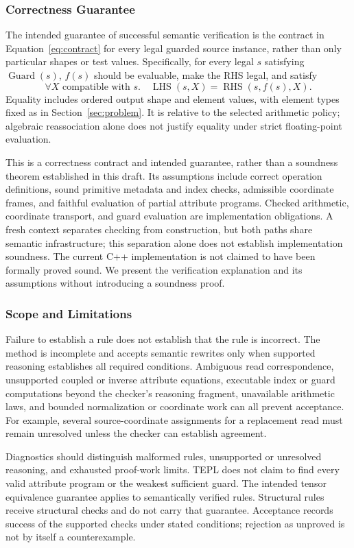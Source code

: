\FloatBarrier
\subsubsection{Correctness Guarantee}
\label{sec:guarantee}
The intended guarantee of successful semantic verification is the contract
in Equation~\eqref{eq:contract} for every legal guarded source instance,
rather than only particular shapes or test values. Specifically, for every
legal $s$ satisfying $\operatorname{Guard}(s)$, $f(s)$ should be evaluable,
make the RHS legal, and satisfy
\begin{equation}
 \forall X\text{ compatible with }s.\quad
 \operatorname{LHS}(s,X)=\operatorname{RHS}(s,f(s),X).
\end{equation}
Equality includes ordered output shape and element values, with element types
fixed as in Section~\ref{sec:problem}. It is relative to the selected arithmetic
policy; algebraic reassociation alone does not justify equality under strict
floating-point evaluation.

This is a correctness contract and intended guarantee, rather than a soundness
theorem established in this draft. Its assumptions include correct operation
definitions, sound primitive metadata and index checks, admissible coordinate
frames, and faithful evaluation of partial attribute programs. Checked
arithmetic, coordinate transport, and guard evaluation are implementation
obligations. A fresh context separates checking from construction, but both
paths share semantic infrastructure; this separation alone does not establish
implementation soundness. The current C++ implementation is not claimed to
have been formally proved sound. We present the verification explanation and
its assumptions without introducing a soundness proof.

\FloatBarrier
\subsubsection{Scope and Limitations}
Failure to establish a rule does not establish that the rule is incorrect.
The method is incomplete and accepts semantic rewrites only when supported
reasoning establishes all required conditions. Ambiguous read correspondence,
unsupported coupled or inverse attribute equations, executable index or guard
computations beyond the checker's reasoning fragment, unavailable arithmetic
laws, and bounded normalization or coordinate work can all prevent acceptance.
For example, several source-coordinate assignments for a replacement read
must remain unresolved unless the checker can establish agreement.

Diagnostics should distinguish malformed rules, unsupported or unresolved
reasoning, and exhausted proof-work limits. TEPL does not claim to find every
valid attribute program or the weakest sufficient guard. The intended tensor
equivalence guarantee applies to semantically verified rules. Structural rules
receive structural checks and do not carry that guarantee. Acceptance records
success of the supported checks under stated conditions; rejection as unproved
is not by itself a counterexample.
